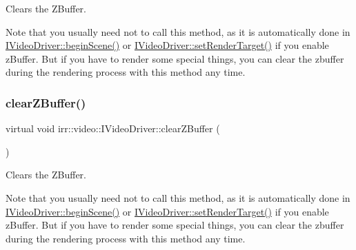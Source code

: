 Clears the Z\+Buffer. 

Note that you usually need not to call this method, as it is automatically done in \hyperlink{classirr_1_1video_1_1IVideoDriver_a015b8f2f18c260a00a858181be1e9945}{I\+Video\+Driver\+::begin\+Scene()} or \hyperlink{classirr_1_1video_1_1IVideoDriver_a8c38a8d8d6d49be53bda55eb0749e7eb}{I\+Video\+Driver\+::set\+Render\+Target()} if you enable z\+Buffer. But if you have to render some special things, you can clear the zbuffer during the rendering process with this method any time. \mbox{\label{classirr_1_1video_1_1IVideoDriver_a2036fe0a27dbd1a123ff5aedb07373a5}} 
\subsubsection{\texorpdfstring{clear\+Z\+Buffer()}{clearZBuffer()}\hspace{0.1cm}{\footnotesize\ttfamily [2/2]}}
{\footnotesize\ttfamily virtual void irr\+::video\+::\+I\+Video\+Driver\+::clear\+Z\+Buffer (\begin{DoxyParamCaption}{ }\end{DoxyParamCaption})\hspace{0.3cm}{\ttfamily [pure virtual]}}



Clears the Z\+Buffer. 

Note that you usually need not to call this method, as it is automatically done in \hyperlink{classirr_1_1video_1_1IVideoDriver_a015b8f2f18c260a00a858181be1e9945}{I\+Video\+Driver\+::begin\+Scene()} or \hyperlink{classirr_1_1video_1_1IVideoDriver_a8c38a8d8d6d49be53bda55eb0749e7eb}{I\+Video\+Driver\+::set\+Render\+Target()} if you enable z\+Buffer. But if you have to render some special things, you can clear the zbuffer during the rendering process with this method any time. \mbox{\label{classirr_1_1video_1_1IVideoDriver_afb541967dbb2def61997f1d69f68d5d1}} 
